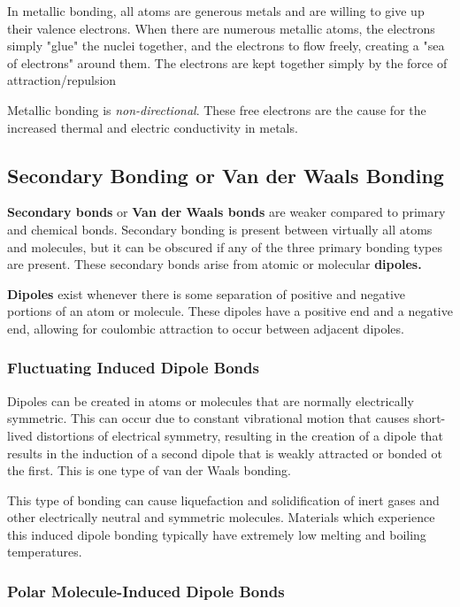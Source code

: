 \documentclass{article}
\begin{document}
In metallic bonding, all atoms are generous metals and are willing to give up their valence electrons. When there are numerous metallic atoms, the electrons simply "glue" the nuclei together, and the electrons to flow freely, creating a "sea of electrons" around them. The electrons are kept together simply by the force of attraction/repulsion

Metallic bonding is \textit{non-directional}. These free electrons are the cause for the increased thermal and electric conductivity in metals.

\subsection{Secondary Bonding or Van der Waals Bonding}

\textbf{Secondary bonds} or \textbf{Van der Waals bonds} are weaker compared to primary and chemical bonds. Secondary bonding is present between virtually all atoms and molecules, but it can be obscured if any of the three primary bonding types are present. These secondary bonds arise from atomic or molecular \textbf{dipoles.}

\textbf{Dipoles} exist whenever there is some separation of positive and negative portions of an atom or molecule. These dipoles have a positive end and a negative end, allowing for coulombic attraction to occur between adjacent dipoles.

\subsubsection{Fluctuating Induced Dipole Bonds}

Dipoles can be created in atoms or molecules that are normally electrically symmetric. This can occur due to constant vibrational motion that causes short-lived distortions of electrical symmetry, resulting in the creation of a dipole that results in the induction of a second dipole that is weakly attracted or bonded ot the first. This is one type of van der Waals bonding.

This type of bonding can cause liquefaction and solidification of inert gases and other electrically neutral and symmetric molecules. Materials which experience this induced dipole bonding typically have extremely low melting and boiling temperatures. 

\subsubsection{Polar Molecule-Induced Dipole Bonds}
\end{document}
